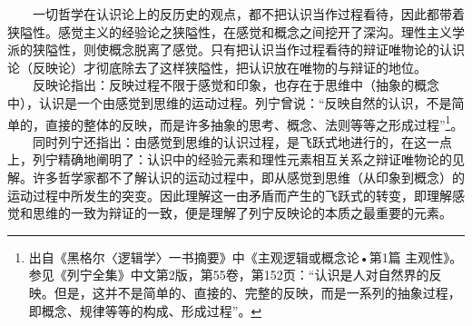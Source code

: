 \documentclass[cn,11pt,chinese]{elegantbook}
\begin{document}
　　一切哲学在认识论上的反历史的观点，都不把认识当作过程看待，因此都带着狭隘性。感觉主义的经验论之狭隘性，在感觉和概念之间挖开了深沟。理性主义学派的狭隘性，则使概念脱离了感觉。只有把认识当作过程看待的辩证唯物论的认识论（反映论）才彻底除去了这样狭隘性，把认识放在唯物的与辩证的地位。\\
　　反映论指出：反映过程不限于感觉和印象，也存在于思维中（抽象的概念中），认识是一个由感觉到思维的运动过程。列宁曾说：“反映自然的认识，不是简单的，直接的整体的反映，而是许多抽象的思考、概念、法则等等之形成过程”\footnote[17]{ 出自《黑格尔〈逻辑学〉一书摘要》中《主观逻辑或概念论•第1篇 主观性》。参见《列宁全集》中文第2版，第55卷，第152页：“认识是人对自然界的反映。但是，这并不是简单的、直接的、完整的反映，而是一系列的抽象过程，即概念、规律等等的构成、形成过程”。}。\\
　　同时列宁还指出：由感觉到思维的认识过程，是飞跃式地进行的，在这一点上，列宁精确地阐明了：认识中的经验元素和理性元素相互关系之辩证唯物论的见解。许多哲学家都不了解认识的运动过程中，即从感觉到思维（从印象到概念）的运动过程中所发生的突变。因此理解这一由矛盾而产生的飞跃式的转变，即理解感觉和思维的一致为辩证的一致，便是理解了列宁反映论的本质之最重要的元素。\\
\end{document}
